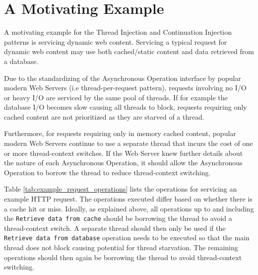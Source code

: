 \documentclass[prodmode]{style/acmlarge}
\begin{document}
\section{A Motivating Example}

A motivating example for the Thread Injection and Continuation Injection
patterns is servicing dynamic web content.  Servicing a typical request for
dynamic web content may use both cached/static content and data retrieved from a
database.

Due to the standardizing of the Asynchronous Operation interface by popular
modern Web Servers (i.e thread-per-request pattern), requests involving no I/O
or heavy I/O are serviced by the same pool of threads.  If for example the
database I/O becomes slow causing all threads to block, requests requiring only
cached content are not prioritized as they are starved of a thread.

Furthermore, for requests requiring only in memory cached content, popular
modern Web Servers continue to use a separate thread that incurs the cost of one
or more thread-context switches.  If the Web Server knew further details about
the nature of each Asynchronous Operation, it should allow the Asynchronous
Operation to borrow the thread to reduce thread-context switching.

Table \ref{tab:example_request_operations} lists the operations for servicing an
example HTTP request.  The operations executed differ based on whether there is
a cache hit or miss.  Ideally, as explained above, all operations up to and
including the \texttt{Retrieve data from cache} should be borrowing the thread
to avoid a thread-context switch.  A separate thread should then only be used if
the \texttt{Retrieve data from database} operation needs to be executed so that
the main thread does not block causing potential for thread starvation.  The
remaining operations should then again be borrowing the thread to avoid
thread-context switching.
\end{document}
